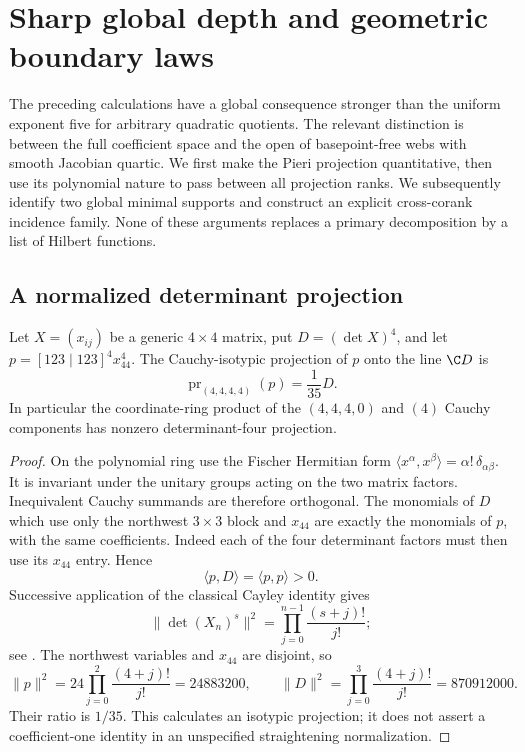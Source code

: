 \section{Sharp global depth and geometric boundary laws}
\label{sec:sharp-global-laws}

The preceding calculations have a global consequence stronger than the
uniform exponent five for arbitrary quadratic quotients.  The relevant
distinction is between the full coefficient space and the open of
basepoint-free webs with smooth Jacobian quartic.  We first make the
Pieri projection quantitative, then use its polynomial nature to pass
between all projection ranks.  We subsequently identify two global
minimal supports and construct an explicit cross-corank incidence
family.  None of these arguments replaces a primary decomposition by a
list of Hilbert functions.

\subsection{A normalized determinant projection}

\begin{lemma}
\label{lem:fischer-determinant-projection}
Let \(X=(x_{ij})\) be a generic \(4\times4\) matrix, put
\(D=(\det X)^4\), and let
\(p=[123\mid123]^4x_{44}^4\).  The Cauchy-isotypic projection of
\(p\) onto the line \(\C D\) is
\[
 \operatorname{pr}_{(4,4,4,4)}(p)=\frac1{35}D.
\]
In particular the coordinate-ring product of the \((4,4,4,0)\)
and \((4)\) Cauchy components has nonzero determinant-four projection.
\end{lemma}
\begin{proof}
On the polynomial ring use the Fischer Hermitian form
\(\langle x^\alpha,x^\beta\rangle=\alpha!\,\delta_{\alpha\beta}\).
It is invariant under the unitary groups acting on the two matrix
factors.  Inequivalent Cauchy summands are therefore orthogonal.
The monomials of \(D\) which use only the northwest \(3\times3\)
block and \(x_{44}\) are exactly the monomials of \(p\), with the
same coefficients.  Indeed each of the four determinant factors must
then use its \(x_{44}\) entry.  Hence
\[
 \langle p,D\rangle=\langle p,p\rangle>0.
\]
Successive application of the classical Cayley identity gives
\[
 \|\det(X_n)^s\|^2
 =\prod_{j=0}^{n-1}\frac{(s+j)!}{j!};
\]
see \cite{CSSCayley}.  The northwest variables and \(x_{44}\) are
disjoint, so
\[
 \|p\|^2=24\prod_{j=0}^{2}\frac{(4+j)!}{j!}=24883200,
 \qquad
 \|D\|^2=\prod_{j=0}^{3}\frac{(4+j)!}{j!}=870912000.
\]
Their ratio is \(1/35\).  This calculates an isotypic projection;
it does not assert a coefficient-one identity in an unspecified
straightening normalization.
\end{proof}

